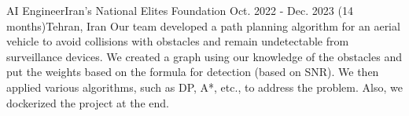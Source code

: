 \resumeSubheadingReza
{AI Engineer}{Iran's National Elites Foundation}
{Oct. 2022 - Dec. 2023 (14 months)}{Tehran, Iran}
{Our team developed a path planning algorithm for an aerial vehicle to avoid collisions with obstacles and remain undetectable from surveillance devices.
 We created a graph using our knowledge of the obstacles and put the weights based on the formula for detection (based on SNR). We then applied various algorithms, such as DP, A*, etc., to address the problem.
Also, we dockerized the project at the end.}